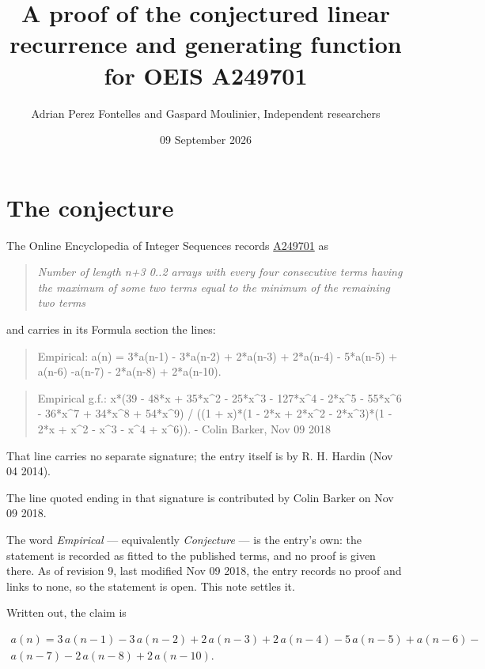 \documentclass[11pt]{article}
\title{A proof of the conjectured linear recurrence and generating function for OEIS A249701}
\author{Adrian Perez Fontelles and Gaspard Moulinier, Independent researchers}
\date{09 September 2026}
\theoremstyle{definition}
\begin{document}
\maketitle
\section{The conjecture}

The Online Encyclopedia of Integer Sequences records \href{https://oeis.org/A249701}{A249701} as

\begin{quote}\itshape Number of length n+3 0..2 arrays with every four consecutive terms having the maximum of some two terms equal to the minimum of the remaining two terms\end{quote}

and carries in its Formula section the lines:

\begin{quote}\ttfamily Empirical: a(n) = 3*a(n-1) - 3*a(n-2) + 2*a(n-3) + 2*a(n-4) - 5*a(n-5) + a(n-6) -a(n-7) - 2*a(n-8) + 2*a(n-10).\end{quote}

\begin{quote}\ttfamily Empirical g.f.: x*(39 - 48*x + 35*x\textasciicircum{}2 - 25*x\textasciicircum{}3 - 127*x\textasciicircum{}4 - 2*x\textasciicircum{}5 - 55*x\textasciicircum{}6 - 36*x\textasciicircum{}7 + 34*x\textasciicircum{}8 + 54*x\textasciicircum{}9) / ((1 + x)*(1 - 2*x + 2*x\textasciicircum{}2 - 2*x\textasciicircum{}3)*(1 - 2*x + x\textasciicircum{}2 - x\textasciicircum{}3 - x\textasciicircum{}4 + x\textasciicircum{}6)). - Colin Barker, Nov 09 2018\end{quote}

That line carries no separate signature; the entry itself is by R. H. Hardin (Nov 04 2014).

The line quoted ending in that signature is contributed by Colin Barker on Nov 09 2018.

The word {\itshape Empirical} --- equivalently {\itshape Conjecture} --- is the entry's own: the statement is recorded as fitted to the published terms, and no proof is given there. As of revision 9, last modified Nov 09 2018, the entry records no proof and links to none, so the statement is open. This note settles it.

Written out, the claim is

\begin{multline*} a(n) = 3\,a(n-1) - 3\,a(n-2) + 2\,a(n-3) + 2\,a(n-4) - 5\,a(n-5) + a(n-6) - \\ a(n-7) - 2\,a(n-8) + 2\,a(n-10). \end{multline*}
\end{document}
